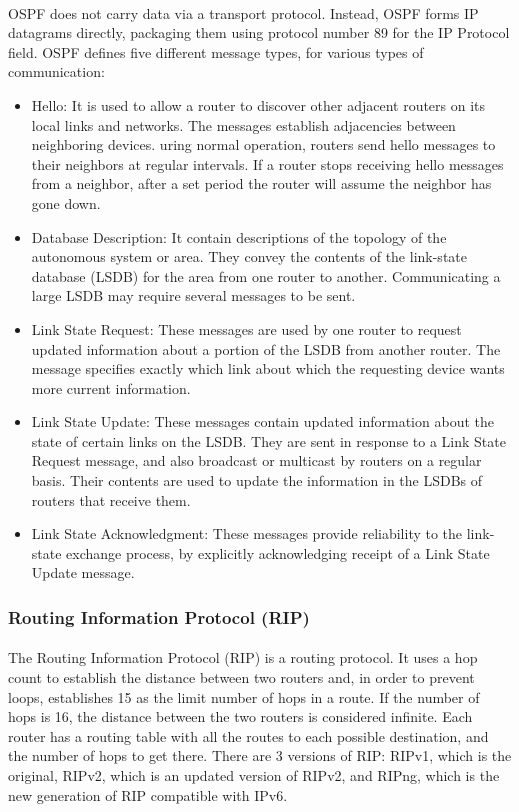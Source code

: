 \paragraph{}OSPF does not carry data via a transport protocol. Instead, OSPF forms IP datagrams directly, packaging them using protocol number 89 for the IP Protocol field. OSPF defines five different message types, for various types of communication:
\begin{itemize}
\item Hello: It is used to allow a router to discover other adjacent routers on its local links and networks. The messages establish adjacencies between neighboring devices. uring normal operation, routers send hello messages to their neighbors at regular intervals. If a router stops receiving hello messages from a neighbor, after a set period the router will assume the neighbor has gone down.
\item Database Description: It contain descriptions of the topology of the autonomous system or area.  They convey the contents of the link-state database (LSDB) for the area from one router to another. Communicating a large LSDB may require several messages to be sent.
\item Link State Request: These messages are used by one router to request updated information about a portion of the LSDB from another router. The message specifies exactly which link about which the requesting device wants more current information.
\item Link State Update: These messages contain updated information about the state of certain links on the LSDB. They are sent in response to a Link State Request message, and also broadcast or multicast by routers on a regular basis. Their contents are used to update the information in the LSDBs of routers that receive them.
\item Link State Acknowledgment: These messages provide reliability to the link-state exchange process, by explicitly acknowledging receipt of a Link State Update message.
\end{itemize}

\subsubsection*{Routing Information Protocol (RIP)\cite{RIPv2}\cite{RIPng}}
\paragraph{}The Routing Information Protocol (RIP) is a routing protocol. It uses a hop count to establish the distance between two routers and, in order to prevent loops, establishes 15 as the limit number of hops in a route. If the number of hops is 16, the distance between the two routers is considered infinite. Each router has a routing table with all the routes to each possible destination, and the number of hops to get there. There are 3 versions of RIP: RIPv1, which is the original, RIPv2, which is an updated version of RIPv2, and RIPng, which is the new generation of RIP compatible with IPv6.
